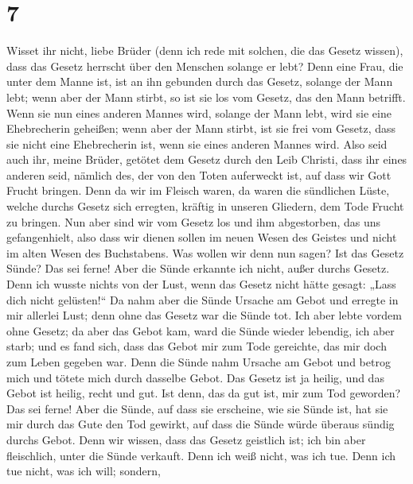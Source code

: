 \hypertarget{section-6}{%
\section{7}\label{section-6}}

 Wisset ihr nicht, liebe Brüder (denn ich rede mit
solchen, die das Gesetz wissen), dass das Gesetz herrscht über den
Menschen solange er lebt?  Denn eine Frau, die unter dem
Manne ist, ist an ihn gebunden durch das Gesetz, solange der Mann lebt;
wenn aber der Mann stirbt, so ist sie los vom Gesetz, das den Mann
betrifft.  Wenn sie nun eines anderen Mannes wird, solange
der Mann lebt, wird sie eine Ehebrecherin geheißen; wenn aber der Mann
stirbt, ist sie frei vom Gesetz, dass sie nicht eine Ehebrecherin ist,
wenn sie eines anderen Mannes wird.  Also seid auch ihr,
meine Brüder, getötet dem Gesetz durch den Leib Christi, dass ihr eines
anderen seid, nämlich des, der von den Toten auferweckt ist, auf dass
wir Gott Frucht bringen.  Denn da wir im Fleisch waren, da
waren die sündlichen Lüste, welche durchs Gesetz sich erregten, kräftig
in unseren Gliedern, dem Tode Frucht zu bringen.  Nun aber
sind wir vom Gesetz los und ihm abgestorben, das uns gefangenhielt, also
dass wir dienen sollen im neuen Wesen des Geistes und nicht im alten
Wesen des Buchstabens.  Was wollen wir denn nun sagen? Ist
das Gesetz Sünde? Das sei ferne! Aber die Sünde erkannte ich nicht,
außer durchs Gesetz. Denn ich wusste nichts von der Lust, wenn das
Gesetz nicht hätte gesagt: „Lass dich nicht gelüsten!{}`` 
Da nahm aber die Sünde Ursache am Gebot und erregte in mir allerlei
Lust; denn ohne das Gesetz war die Sünde tot.  Ich aber
lebte vordem ohne Gesetz; da aber das Gebot kam, ward die Sünde wieder
lebendig,  ich aber starb; und es fand sich, dass das
Gebot mir zum Tode gereichte, das mir doch zum Leben gegeben war.
 Denn die Sünde nahm Ursache am Gebot und betrog mich und
tötete mich durch dasselbe Gebot.  Das Gesetz ist ja
heilig, und das Gebot ist heilig, recht und gut.  Ist
denn, das da gut ist, mir zum Tod geworden? Das sei ferne! Aber die
Sünde, auf dass sie erscheine, wie sie Sünde ist, hat sie mir durch das
Gute den Tod gewirkt, auf dass die Sünde würde überaus sündig durchs
Gebot.  Denn wir wissen, dass das Gesetz geistlich ist;
ich bin aber fleischlich, unter die Sünde verkauft.  Denn
ich weiß nicht, was ich tue. Denn ich tue nicht, was ich will; sondern,
